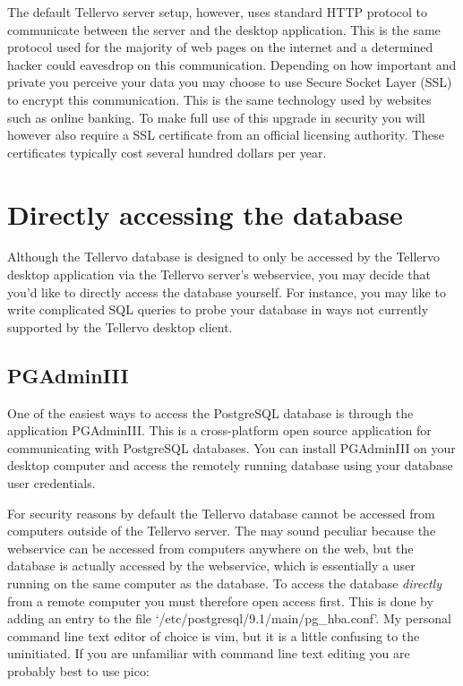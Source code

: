 The default Tellervo server setup, however, uses standard HTTP protocol to communicate between the server and the desktop application.  This is the same protocol used for the majority of web pages on the internet and a determined hacker could eavesdrop on this communication.  Depending on how important and private you perceive your data you may choose to use Secure Socket Layer (SSL) to encrypt this communication.  This is the same technology used by websites such as online banking.  To make full use of this upgrade in security you will however also require a SSL certificate from an official licensing authority.  These certificates typically cost several hundred dollars per year. 



\section{Directly accessing the database}
Although the Tellervo database is designed to only be accessed by the Tellervo desktop application via the Tellervo server's webservice, you may decide that you'd like to directly access the database yourself.  For instance, you may like to write complicated SQL queries to probe your database in ways not currently supported by the Tellervo desktop client. 


\subsection{PGAdminIII}
One of the easiest ways to access the PostgreSQL database is through the application PGAdminIII.  This is a cross-platform open source application for communicating with PostgreSQL databases.  You can install PGAdminIII on your desktop computer and access the remotely running database using your database user credentials.  

For security reasons by default the Tellervo database cannot be accessed from computers outside of the Tellervo server.  The may sound peculiar because the webservice can be accessed from computers anywhere on the web, but the database is actually accessed by the webservice, which is essentially a user running on the same computer as the database.  To access the database \emph{directly} from a remote computer you must therefore open access first.  This is done by adding an entry to the file `/etc/postgresql/9.1/main/pg\_hba.conf'.  My personal command line text editor of choice is vim, but it is a little confusing to the uninitiated.  If you are unfamiliar with command line text editing you are probably best to use pico:

